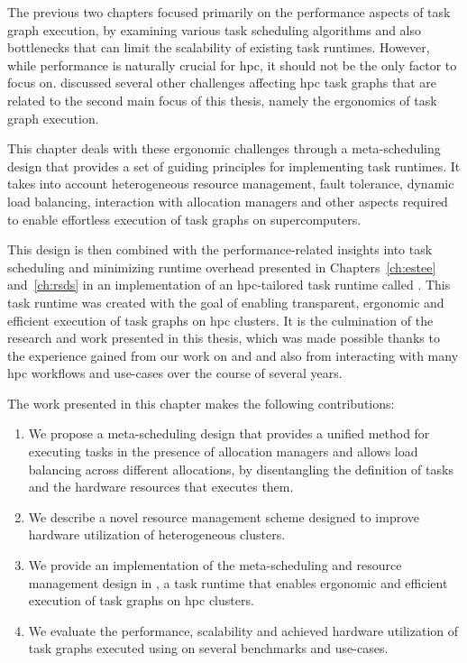 The previous two chapters focused primarily on the performance aspects of task graph execution, by
examining various task scheduling algorithms and also bottlenecks that can limit the scalability of
existing task runtimes. However, while performance is naturally crucial for
\gls{hpc}, it should not be the only factor to focus on. 
discussed several other challenges affecting \gls{hpc} task graphs that are related
to the second main focus of this thesis, namely the ergonomics of task graph execution.

This chapter deals with these ergonomic challenges through a meta-scheduling design that provides a
set of guiding principles for implementing task runtimes. It takes into account heterogeneous
resource management, fault tolerance, dynamic load balancing, interaction with allocation managers
and other aspects required to enable effortless execution of task graphs on supercomputers.

This design is then combined with the performance-related insights into task scheduling and
minimizing runtime overhead presented in Chapters~\ref{ch:estee}
and~\ref{ch:rsds} in an implementation of an \gls{hpc}-tailored task
runtime called \hyperqueue{}. This task runtime was created with the goal of enabling
transparent, ergonomic and efficient execution of task graphs on \gls{hpc} clusters.
It is the culmination of the research and work presented in this thesis, which was made possible
thanks to the experience gained from our work on \estee{} and
\rsds{} and also from interacting with many \gls{hpc} workflows and
use-cases over the course of several years.

The work presented in this chapter makes the following contributions:
\begin{enumerate}[itemsep=0pt,topsep=5pt]
	\item We propose a meta-scheduling design that provides a unified method for executing tasks in the
	      presence of allocation managers and allows load balancing across different allocations, by
	      disentangling the definition of tasks and the hardware resources that executes them.
	\item We describe a novel resource management scheme designed to improve hardware utilization of
	      heterogeneous clusters.
	\item We provide an implementation of the meta-scheduling and resource management design in
	      \hyperqueue{}, a task runtime that enables ergonomic and efficient execution of task graphs
	      on \gls{hpc} clusters.
	\item We evaluate the performance, scalability and achieved hardware utilization of task graphs executed
	      using \hyperqueue{} on several benchmarks and use-cases.
\end{enumerate}

